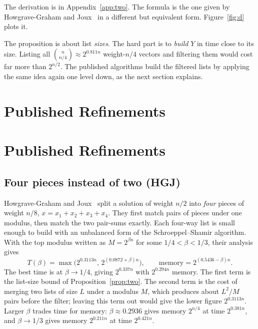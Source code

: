 \documentclass[conference]{IEEEtran}
\begin{document}
The derivation is in Appendix~\ref{app:two}. The formula is the one given by
Howgrave-Graham and Joux~\cite[Sec.~4.1]{hgj} in a different but equivalent
form. Figure~\ref{fig:d} plots it.

The proposition is about list \emph{sizes}. The hard part is to \emph{build} $Y$
in time close to its size. Listing all $\binom{n}{n/4}\approx2^{0.811n}$
weight-$n/4$ vectors and filtering them would cost far more than $2^{n/2}$. The
published algorithms build the filtered lists by applying the same idea again
one level down, as the next section explains.

\section{Published Refinements}\label{sec:published}
\section{Published Refinements}\label{sec:published}

\subsection{Four pieces instead of two (HGJ)}
Howgrave-Graham and Joux~\cite{hgj} split a solution of weight $n/2$ into
\emph{four} pieces of weight $n/8$, $x=x_1+x_2+x_3+x_4$. They first match pairs
of pieces under one modulus, then match the two pair-sums exactly. Each
four-way list is small enough to build with an unbalanced form of the
Schroeppel--Shamir algorithm. With the top modulus written as
$M=2^{\beta n}$ for some $1/4<\beta<1/3$, their analysis gives
\begin{equation}\label{eq:hgj}
T(\beta)=\max\bigl(2^{0.3113n},\,2^{(0.0872+\beta)n}\bigr),\qquad
\text{memory}=2^{(0.5436-\beta)n}.
\end{equation}
The best time is at $\beta\to1/4$, giving $2^{0.337n}$ with $2^{0.294n}$
memory. The first term is the list-size bound of
Proposition~\ref{prop:two}. The second term is the cost of merging two lists of
size $L$ under a modulus $M$, which produces about $L^2/M$ pairs before the
filter; leaving this term out would give the lower figure $2^{0.3113n}$.
Larger $\beta$ trades time for memory: $\beta\approx0.2936$
gives memory $2^{n/4}$ at time $2^{0.381n}$, and $\beta\to1/3$ gives memory
$2^{0.211n}$ at time $2^{0.421n}$.
\end{document}
